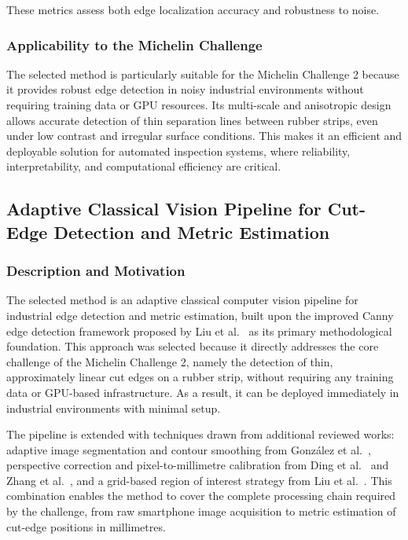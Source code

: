 \documentclass[11pt]{article}
\begin{document}
These metrics assess both edge localization accuracy and robustness to noise.

\subsubsection{Applicability to the Michelin Challenge}

The selected method is particularly suitable for the Michelin Challenge 2 because it provides robust edge detection in noisy industrial environments without requiring training data or GPU resources. Its multi-scale and anisotropic design allows accurate detection of thin separation lines between rubber strips, even under low contrast and irregular surface conditions. This makes it an efficient and deployable solution for automated inspection systems, where reliability, interpretability, and computational efficiency are critical.

\subsection{Adaptive Classical Vision Pipeline for Cut-Edge Detection and Metric Estimation}

\subsubsection{Description and Motivation}

The selected method is an adaptive classical computer vision pipeline for industrial edge detection and metric estimation, built upon the improved Canny edge detection framework proposed by Liu et al.~\cite{Liu2024b} as its primary methodological foundation. This approach was selected because it directly addresses the core challenge of the Michelin Challenge 2, namely the detection of thin, approximately linear cut edges on a rubber strip, without requiring any training data or GPU-based infrastructure. As a result, it can be deployed immediately in industrial environments with minimal setup.

The pipeline is extended with techniques drawn from additional reviewed works: adaptive image segmentation and contour smoothing from González et al.~\cite{Gonzalez2024}, perspective correction and pixel-to-millimetre calibration from Ding et al.~\cite{Ding2025Homography} and Zhang et al.~\cite{Zhang2024Calibration}, and a grid-based region of interest strategy from Liu et al.~\cite{Liu2024a}. This combination enables the method to cover the complete processing chain required by the challenge, from raw smartphone image acquisition to metric estimation of cut-edge positions in millimetres.
\end{document}
